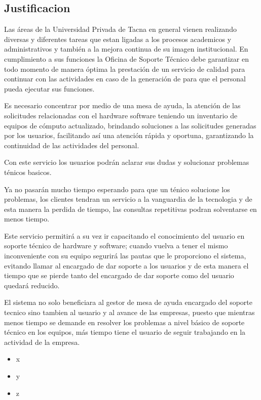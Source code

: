 \documentclass[preprint,12pt]{elsarticle}
\begin{document}

\subsection {\textbf{Justificacion}}

Las áreas de la Universidad Privada de Tacna en general vienen realizando diversas y diferentes tareas que estan ligadas a los procesos academicos y administrativos y también a la mejora continua de su imagen institucional.
En cumplimiento a sus funciones la Oficina de Soporte Técnico debe garantizar en todo momento de manera óptima la prestación de un servicio de calidad para continuar con las actividades en caso de la generación de para que el personal pueda ejecutar sus funciones.
 
Es necesario concentrar por medio de una mesa de ayuda, la atención de las solicitudes relacionadas con el hardware  software teniendo un inventario de equipos de cómputo actualizado, brindando soluciones a las solicitudes generadas por los usuarios, facilitando así una atención rápida y oportuna, garantizando la continuidad de las actividades del personal.

Con este servicio los usuarios podrán aclarar sus dudas y solucionar problemas ténicos basicos.

Ya no pasarán mucho tiempo esperando para que un ténico solucione los problemas, los clientes tendran un servicio a la vanguardia de la tecnologia y de esta manera la perdida de tiempo, las consultas repetitivas podran solventarse en menos tiempo.

Este servicio permitirá a su vez ir capacitando el conocimiento del usuario en soporte técnico de hardware y software; cuando vuelva a tener el mismo inconveniente con su equipo segurirá las pautas que le proporciono el sistema, evitando llamar al encargado de dar soporte a los usuarios y de esta manera el tiempo que se pierde tanto del encargado de dar soporte como del usuario quedará reducido.

El sistema no solo beneficiara al gestor de mesa de ayuda encargado del soporte tecnico sino tambien al usuario y al avance de las empresas, puesto que mientras menos tiempo se demande en resolver los problemas a nivel básico de soporte técnico en los equipos, más tiempo tiene el usuario de seguir trabajando en la actividad de la empresa.

\cite{Gartner} 

\begin{itemize}
	\item x
	\item y
	\item z
\end{itemize}
\end{document}
